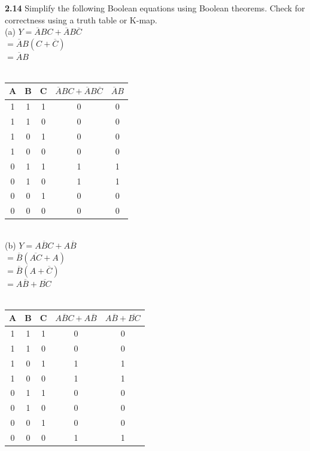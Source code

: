 \documentclass[12pt,a4paper]{report}
\newcommand*{\al}{\overline{A}}
\newcommand*{\bl}{\overline{B}}
\newcommand*{\cl}{\overline{C}}
\begin{document}
\begin{normalsize}
\textbf{2.14} Simplify the following Boolean equations using Boolean theorems. Check for correctness using a truth table or K-map. \\

(a) $ Y = \overline{A}BC + \overline{A}B\overline{C} $ \\
$ = \al{}B(C + \cl{}) $ \\
$ = \al{}B $ \\ \\
\begin{tabular}{|c|c|c|c|c|}
A & B & C & $ \al{}BC+\al{}B\cl{} $ & $ \al{}B $ \\ 
\hline 
1 & 1 & 1 & 0 & 0 \\ 
\hline 
1 & 1 & 0 & 0 & 0 \\ 
\hline 
1 & 0 & 1 & 0 & 0 \\ 
\hline 
1 & 0 & 0 & 0 & 0 \\ 
\hline 
0 & 1 & 1 & 1 & 1 \\ 
\hline 
0 & 1 & 0 & 1 & 1 \\ 
\hline 
0 & 0 & 1 & 0 & 0 \\ 
\hline 
0 & 0 & 0 & 0 & 0 \\ 
\hline 
\end{tabular} \\

(b) $ Y = \overline{ABC} + A\overline{B} $ \\
$ = \bl{}(\overline{AC} + A) $ \\
$ = \bl{}(A + \cl{}) $ \\
$ = A\bl{} + \overline{BC} $ \\ \\
\begin{tabular}{|c|c|c|c|c|}
A & B & C & $ \overline{ABC} + A\overline{B} $ & $ A\bl{} + \overline{BC} $ \\ 
\hline 
1 & 1 & 1 & 0 & 0 \\ 
\hline 
1 & 1 & 0 & 0 & 0 \\ 
\hline 
1 & 0 & 1 & 1 & 1 \\ 
\hline 
1 & 0 & 0 & 1 & 1 \\ 
\hline 
0 & 1 & 1 & 0 & 0 \\ 
\hline 
0 & 1 & 0 & 0 & 0 \\ 
\hline 
0 & 0 & 1 & 0 & 0 \\ 
\hline 
0 & 0 & 0 & 1 & 1 \\ 
\hline 
\end{tabular} \\ \\



\end{normalsize}
\end{document}
